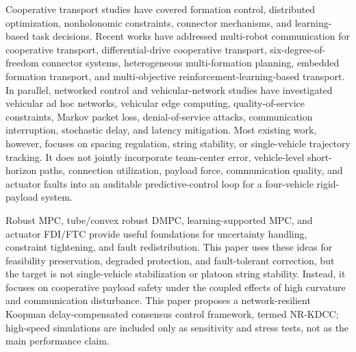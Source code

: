\documentclass[twocolumn,3p,times,procedia]{elsarticle}
\newcommand{\Method}{NR-KDCC}
\begin{document}
Cooperative transport studies have covered formation control, distributed optimization, nonholonomic constraints, connector mechanisms, and learning-based task decisions. Recent works have addressed multi-robot communication for cooperative transport, differential-drive cooperative transport, six-degree-of-freedom connector systems, heterogeneous multi-formation planning, embedded formation transport, and multi-objective reinforcement-learning-based transport\cite{an2023multiRobotCommTransport,cooperativeTransport2024ras,gong2023sixDofTransport,zhang2024heterogeneousTransport,embeddedFormationTransport2024cep,multiObjectiveTransport2024mechatronics,intelligentCollaborativeTransport2024}. In parallel, networked control and vehicular-network studies have investigated vehicular ad hoc networks, vehicular edge computing, quality-of-service constraints, Markov packet loss, denial-of-service attacks, communication interruption, stochastic delay, and latency mitigation\cite{tan2022mlVehicularDcn,zhao2025blockchainVanetDcn,wu2025drlVecDcn,bian2025markovPacketLossDMPC,dosDMPC2024isa,robustCommunicationLoss2025trb,bai2023robustLongitudinalDMPC,bao2024robustUkfMpc,networkLatencyCav2024sensors,dai2024networkedPredictiveControl}. Most existing work, however, focuses on spacing regulation, string stability, or single-vehicle trajectory tracking. It does not jointly incorporate team-center error, vehicle-level short-horizon paths, connection utilization, payload force, communication quality, and actuator faults into an auditable predictive-control loop for a four-vehicle rigid-payload system.

Robust MPC, tube/convex robust DMPC, learning-supported MPC, and actuator FDI/FTC provide useful foundations for uncertainty handling, constraint tightening, and fault redistribution\cite{mayne2000constrainedMpc,mayne2005robustMpc,convexRobustDMPC2025ejc,gasparino2023nnMpcUncertainty,liu2024adaptiveFtcSbw,xu2024fdFtcSteering}. This paper uses these ideas for feasibility preservation, degraded protection, and fault-tolerant correction, but the target is not single-vehicle stabilization or platoon string stability. Instead, it focuses on cooperative payload safety under the coupled effects of high curvature and communication disturbance. This paper proposes a network-resilient Koopman delay-compensated consensus control framework, termed \Method{}; high-speed simulations are included only as sensitivity and stress tests, not as the main performance claim.
\end{document}
